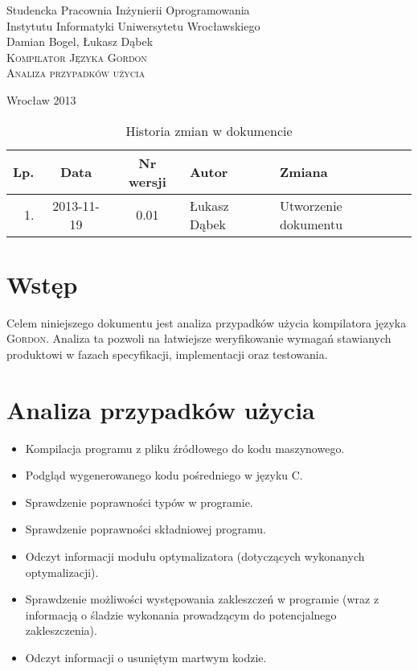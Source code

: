 \documentclass{documentation}
\begin{document}
\begin{titlepage}
\begin{center}
Studencka Pracownia Inżynierii Oprogramowania\\
Instytutu Informatyki Uniwersytetu Wrocławskiego\\[6cm]

Damian Bogel, Łukasz Dąbek\\[1cm]
\textsc{\LARGE Kompilator Języka Gordon}\\[0.5cm]
\textsc{\large Analiza przypadków użycia}

\vfill
Wrocław 2013 \\[2.5cm]

\end{center}
\end{titlepage}

\newpage
\begin{table}
	\centering
	\caption{Historia zmian w dokumencie}
		\begin{tabular}{|r|c|c|l|l|}
		\hline
		Lp.  & Data       & Nr wersji & Autor                 & Zmiana \\ \hline
		1.   & 2013-11-19 & 0.01 & Łukasz Dąbek & Utworzenie dokumentu \\ \hline
	\end{tabular}
\end{table}
\newpage

\tableofcontents
\setcounter{page}{2}

\newpage

\section{Wstęp}
\noindent Celem niniejszego dokumentu jest analiza przypadków użycia kompilatora
języka \textsc{Gordon}. Analiza ta pozwoli na łatwiejsze weryfikowanie wymagań
stawianych produktowi w fazach specyfikacji, implementacji oraz testowania.

\section{Analiza przypadków użycia}
\begin{itemize}
    \item Kompilacja programu z pliku źródłowego do kodu maszynowego.
    \item Podgląd wygenerowanego kodu pośredniego w języku \textsc{C}.
    \item Sprawdzenie poprawności typów w programie.
    \item Sprawdzenie poprawności składniowej programu.
    \item Odczyt informacji modułu optymalizatora (dotyczących wykonanych optymalizacji).
    \item Sprawdzenie możliwości występowania zakleszczeń w programie (wraz z informacją
        o śladzie wykonania prowadzącym do potencjalnego zakleszczenia).
    \item Odczyt informacji o usuniętym martwym kodzie. 
\end{itemize}
\end{document}
